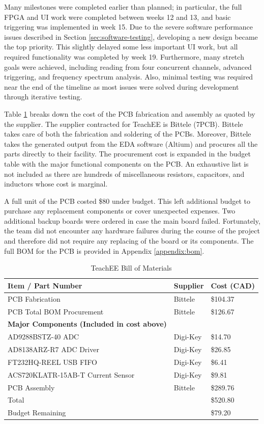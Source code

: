 \documentclass[letterpaper,11pt]{article}
\begin{document}
Many milestones were completed earlier than planned; in particular, the full FPGA
and UI work were completed between weeks 12 and 13, and basic triggering was
implemented in week 15. Due to the severe software performance issues described in
Section \ref{sec:software-testing}, developing a new design became the top priority.
This slightly delayed some less important UI work, but all required functionality was
completed by week 19. Furthermore, many stretch goals were achieved, including
reading from four concurrent channels, advanced triggering, and frequency spectrum
analysis. Also, minimal testing was required near the end of the timeline as most
issues were solved during development through iterative testing.

Table \ref{tab:abbreviated-bom} breaks down the cost of the PCB
fabrication and assembly as quoted by the supplier. The supplier contracted for
TeachEE is Bittele (7PCB). Bittele takes care of both the fabrication and
soldering of the PCBs. Moreover, Bittele takes the generated output from the EDA
software (Altium) and procures all the parts directly to their facility. The
procurement cost is expanded in the budget table with the major functional
components on the PCB. An exhaustive list is not included as there are hundreds
of miscellaneous resistors, capacitors, and inductors whose cost is marginal.

A full unit of the PCB costed \$80 under budget. This left
additional budget to purchase any replacement components or
cover unexpected expenses. Two additional backup boards were ordered in case the main
board failed. Fortunately, the team did not encounter any hardware failures during the
course of the project and therefore did not require any replacing of the board or its
components. The full BOM for the PCB is provided in Appendix \ref{appendix:bom}.

\begin{table}[H]
    \caption{TeachEE Bill of Materials}
    \begin{tabularx}{\textwidth}{l|l|l}
        \textbf{Item / Part Number} & \textbf{Supplier} & \textbf{Cost (CAD)} \\
        \hline
        PCB Fabrication & Bittele & \$104.37\\
        PCB Total BOM Procurement & Bittele & \$126.67\\
        \hline
        \textbf{Major Components (Included in cost above)}& &\\
        \hline
        AD9288BSTZ-40 ADC & Digi-Key & \$14.70\\
        AD8138ARZ-R7 ADC Driver & Digi-Key & \$26.85\\
        FT232HQ-REEL USB FIFO & Digi-Key & \$6.41\\
        ACS720KLATR-15AB-T Current Sensor & Digi-Key & \$9.81\\
        \hline
        PCB Assembly & Bittele & \$289.76\\
        \hline
        Total & & \$520.80\\
        \hline
        Budget Remaining & & \$79.20
    \end{tabularx} 
\label{tab:abbreviated-bom}
\end{table}
\end{document}
